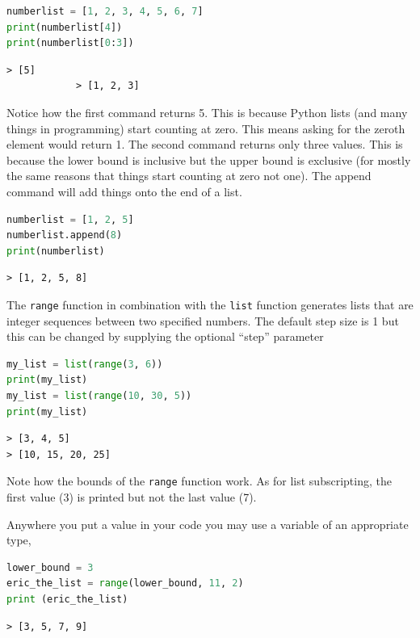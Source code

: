 		\begin{lstlisting}[language=Python]
numberlist = [1, 2, 3, 4, 5, 6, 7]
print(numberlist[4])
print(numberlist[0:3])\end{lstlisting}
		\begin{verbatim}> [5]
			> [1, 2, 3]
		\end{verbatim}
		Notice how the first command returns 5. This is because Python lists (and many things in programming) start counting at zero. This means asking for the zeroth element would return 1.
		The second command returns only three values. This is because the lower bound is inclusive but the upper bound is exclusive (for mostly the same reasons that things start counting at zero not one). 
		The append command will add things onto the end of a list.
		\begin{lstlisting}[language=Python]
numberlist = [1, 2, 5]
numberlist.append(8)
print(numberlist)	\end{lstlisting}
		\begin{verbatim}> [1, 2, 5, 8]\end{verbatim}
		The \texttt{range} function in combination with the \texttt{list} function generates lists that are integer sequences between two specified numbers. The default step size is 1 but this can be changed by supplying the optional ``step'' parameter
\begin{lstlisting}[language=Python]
my_list = list(range(3, 6))
print(my_list)	
my_list = list(range(10, 30, 5))
print(my_list)
\end{lstlisting}
		\begin{verbatim}
> [3, 4, 5]
> [10, 15, 20, 25]\end{verbatim}
		Note how the bounds of the \texttt{range} function work. As for list subscripting, the first value (3) is printed but not the last value (7).

Anywhere you put a value in your code you may use a variable of an appropriate type,
\begin{lstlisting}[language=Python]
lower_bound = 3
eric_the_list = range(lower_bound, 11, 2)
print (eric_the_list)
\end{lstlisting}
		\begin{verbatim}
> [3, 5, 7, 9]\end{verbatim}
